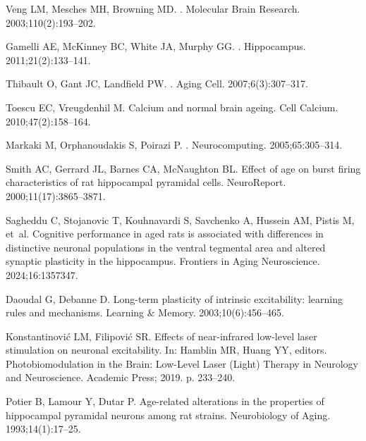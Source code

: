 \documentclass[10pt,letterpaper]{article}
\begin{document}
\begin{thebibliography}{100}
Veng LM, Mesches MH, Browning MD.
.
\newblock Molecular Brain Research. 2003;110(2):193--202.

Gamelli AE, McKinney BC, White JA, Murphy GG.
.
\newblock Hippocampus. 2011;21(2):133--141.

Thibault O, Gant JC, Landfield PW.
.
\newblock Aging Cell. 2007;6(3):307--317.

Toescu EC, Vreugdenhil M.
\newblock Calcium and normal brain ageing.
\newblock Cell Calcium. 2010;47(2):158--164.

Markaki M, Orphanoudakis S, Poirazi P.
.
\newblock Neurocomputing. 2005;65:305--314.

Smith AC, Gerrard JL, Barnes CA, McNaughton BL.
\newblock Effect of age on burst firing characteristics of rat hippocampal pyramidal cells.
\newblock NeuroReport. 2000;11(17):3865--3871.

Sagheddu C, Stojanovic T, Kouhnavardi S, Savchenko A, Hussein AM, Pistis M, et~al.
\newblock Cognitive performance in aged rats is associated with differences in distinctive neuronal populations in the ventral tegmental area and altered synaptic plasticity in the hippocampus.
\newblock Frontiers in Aging Neuroscience. 2024;16:1357347.

Daoudal G, Debanne D.
\newblock Long-term plasticity of intrinsic excitability: learning rules and mechanisms.
\newblock Learning \& Memory. 2003;10(6):456--465.

Konstantinovi{\'c} LM, Filipovi{\'c} SR.
\newblock Effects of near-infrared low-level laser stimulation on neuronal excitability.
\newblock In: Hamblin MR, Huang YY, editors. Photobiomodulation in the Brain: Low-Level Laser (Light) Therapy in Neurology and Neuroscience. Academic Press; 2019. p. 233--240.

Potier B, Lamour Y, Dutar P.
\newblock Age-related alterations in the properties of hippocampal pyramidal neurons among rat strains.
\newblock Neurobiology of Aging. 1993;14(1):17--25.

\end{thebibliography}
\end{document}
